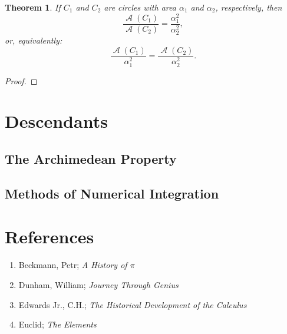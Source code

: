 \documentclass[letterpaper, 12pt]{amsart}
\DeclareMathOperator{\A}{\mathcal{A}}
\newtheorem{thm}{Theorem}[section]
\theoremstyle{definition}  %
\begin{document}
		\begin{thm}
		If $C_{1}$ and $C_{2}$ are circles with area $\alpha_{1}$ and $\alpha_{2}$, respectively, then $$\frac{\A(C_{1})}{\A(C_{2})} = \frac{\alpha_{1}^{2}}{\alpha_{2}^{2}},$$ or, equivalently: $$\frac{\A(C_{1})}{\alpha_{1}^{2}} = \frac{\A(C_{2})}{\alpha_{2}^{2}}.$$
		\end{thm}
		\begin{proof}
		\end{proof}


	\newpage

	\section{Descendants}
	\label{sec:descendants}
		\subsection{The Archimedean Property}
		\label{sub:the_archimedean_property}

		\subsection{Methods of Numerical Integration}
		\label{sub:methods_of_numerical_integration}
	\newpage

	\appendix

	\section{References}
	\label{sec:references}
	\begin{enumerate}
		\item Beckmann, Petr; \textit{A History of $\pi$}
		\item Dunham, William; \textit{Journey Through Genius}
		\item Edwards Jr., C.H.; \textit{The Historical Development of the Calculus}
		\item Euclid; \textit{The Elements}
	\end{enumerate}
\end{document}
